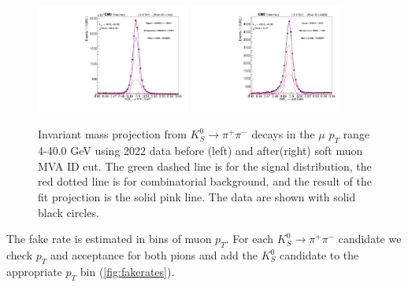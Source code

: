 \begin{figure}[!h]
  \begin{center}
    \includegraphics[width=0.45\textwidth]{figures/chapter4/fakerate/Combined_data_combined_522_2022_ks_trigger_lxy_hv0_Mass_allbin_bla.pdf}
    \includegraphics[width=0.45\textwidth]{figures/chapter4/fakerate/Combined_data_combined_522_2022_ks_trigger_lxy_hv0_Mass_muid_20_allbin_bla.pdf}\\
  \end{center}
  \caption{Invariant mass projection from $K_S^0 \to \pi^+ \pi^-$ decays in the $\mu$
    $p_{T}$ range 4-40.0 GeV using 2022 data before (left) and after(right) soft muon MVA ID cut.
    The green dashed line is for the signal distribution, the red
    dotted line is for combinatorial background, and the result of the
    fit projection is the solid pink line. The data are shown with
    solid black circles.}
  \label{fig:fit_example_pion}
\end{figure}

The fake rate is estimated in bins of muon $p_{T}$. For each $K_S^0 \to \pi^+ \pi^-$ candidate we check $p_{T}$ and acceptance for both pions and add the $K_S^0$ candidate to the appropriate $p_{T}$ bin (\ref{fig:fakerates}).

